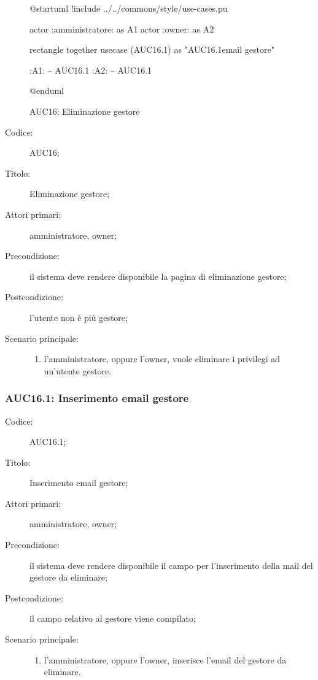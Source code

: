 \documentclass[../../../analisi-dei-requisiti.tex]{subfiles}
\begin{document}
\begin{figure}[H]
  \centering
  \begin{plantuml}
  @startuml
  !include ../../commons/style/use-cases.pu

  actor :amministratore: as A1
  actor :owner: as A2


  rectangle {
    together {
      usecase (AUC16.1) as "AUC16.1\nInserimento email gestore"
    }
  }

  :A1: -- AUC16.1
  :A2: -- AUC16.1

  @enduml
  \end{plantuml}
  \caption{AUC16: Eliminazione gestore}%
  \label{fig:auc16}
\end{figure}

\begin{description}
  \item[Codice:] AUC16;
  \item[Titolo:] Eliminazione gestore;
  \item[Attori primari:] amministratore, owner;
  \item[Precondizione:] il sistema deve rendere disponibile la pagina di eliminazione gestore;
  \item[Postcondizione:] l'utente non è più gestore;
  \item[Scenario principale:]
  \begin{enumerate}
    \item l'amministratore, oppure l'owner, vuole eliminare i privilegi ad un'utente gestore.
  \end{enumerate}
\end{description}

\subsubsection{AUC16.1: Inserimento email gestore}%
\label{subs:AUC16.1}
\begin{description}
  \item[Codice:] AUC16.1;
  \item[Titolo:] Inserimento email gestore;
  \item[Attori primari:] amministratore, owner;
  \item[Precondizione:] il sistema deve rendere disponibile il campo per l'inserimento della mail del gestore da eliminare;
  \item[Postcondizione:] il campo relativo al gestore viene compilato;
  \item[Scenario principale:]
  \begin{enumerate}
    \item l'amministratore, oppure l'owner, inserisce l'email del gestore da eliminare.
  \end{enumerate}
\end{description}
\end{document}
